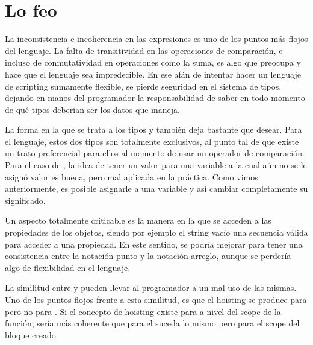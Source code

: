 \section{Lo feo}

La inconsistencia e incoherencia en las expresiones es uno de los puntos más flojos del lenguaje. La falta de transitividad en las operaciones de comparación, e incluso de conmutatividad en operaciones como la suma, es algo que preocupa y hace que el lenguaje sea impredecible. En ese afán de intentar hacer un lenguaje de scripting sumamente flexible, se pierde seguridad en el sistema de tipos, dejando en manos del programador la responsabilidad de saber en todo momento de qué tipos deberían ser los datos que maneja.

La forma en la que se trata a los tipos  y  también deja bastante que desear. Para el lenguaje, estos dos tipos son totalmente exclusivos, al punto tal de que existe un trato preferencial para ellos al momento de usar un operador de comparación. Para el caso de , la idea de tener un valor para una variable a la cual aún no se le asignó valor es buena, pero mal aplicada en la práctica. Como vimos anteriormente, es posible asignarle  a una variable y así cambiar completamente su significado.

Un aspecto totalmente criticable es la manera en la que se acceden a las propiedades de los objetos, siendo por ejemplo el string vacío una secuencia válida para acceder a una propiedad. En este sentido, se podría mejorar para tener una consistencia entre la notación punto y la notación arreglo, aunque se perdería algo de flexibilidad en el lenguaje.

La similitud entre  y  pueden llevar al programador a un mal uso de las mismas. Uno de los puntos flojos frente a esta similitud, es que el hoisting se produce para  pero no para . Si el concepto de hoisting existe para  a nivel del scope de la función, sería más coherente que para el  suceda lo mismo pero para el scope del bloque creado.

 